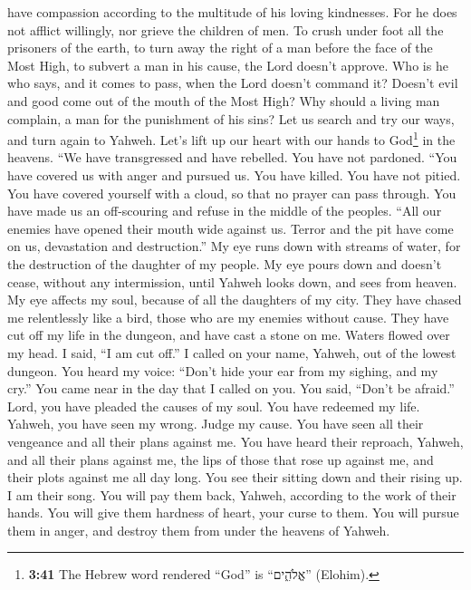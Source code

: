 have compassion according to the multitude of his loving kindnesses.
 For he does not afflict willingly, nor grieve the
children of men.  To crush under foot all the prisoners
of the earth,  to turn away the right of a man before the
face of the Most High,  to subvert a man in his cause,
the Lord doesn't approve.  Who is he who says, and it
comes to pass, when the Lord doesn't command it?  Doesn't
evil and good come out of the mouth of the Most High? 
Why should a living man complain, a man for the punishment of his sins?
 Let us search and try our ways, and turn again to
Yahweh.  Let's lift up our heart with our hands to
God\footnote{\textbf{3:41} The Hebrew word rendered ``God'' is
  ``אֱלֹהִ֑ים'' (Elohim).} in the heavens.  ``We have
transgressed and have rebelled. You have not pardoned. 
``You have covered us with anger and pursued us. You have killed. You
have not pitied.  You have covered yourself with a cloud,
so that no prayer can pass through.  You have made us an
off-scouring and refuse in the middle of the peoples. 
``All our enemies have opened their mouth wide against us.
 Terror and the pit have come on us, devastation and
destruction.''  My eye runs down with streams of water,
for the destruction of the daughter of my people.  My eye
pours down and doesn't cease, without any intermission, 
until Yahweh looks down, and sees from heaven.  My eye
affects my soul, because of all the daughters of my city.
 They have chased me relentlessly like a bird, those who
are my enemies without cause.  They have cut off my life
in the dungeon, and have cast a stone on me.  Waters
flowed over my head. I said, ``I am cut off.''  I called
on your name, Yahweh, out of the lowest dungeon.  You
heard my voice: ``Don't hide your ear from my sighing, and my cry.''
 You came near in the day that I called on you. You said,
``Don't be afraid.''  Lord, you have pleaded the causes
of my soul. You have redeemed my life.  Yahweh, you have
seen my wrong. Judge my cause.  You have seen all their
vengeance and all their plans against me.  You have heard
their reproach, Yahweh, and all their plans against me, 
the lips of those that rose up against me, and their plots against me
all day long.  You see their sitting down and their
rising up. I am their song.  You will pay them back,
Yahweh, according to the work of their hands.  You will
give them hardness of heart, your curse to them.  You
will pursue them in anger, and destroy them from under the heavens of
Yahweh.

